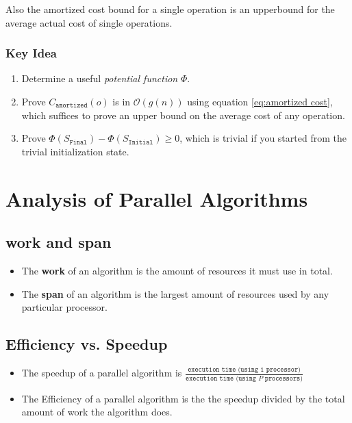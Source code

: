 \documentclass[12pt, letterpaper]{book}
\newcommand{\bigO}{\mathcal{O}}
\begin{document}
Also the amortized cost bound for a single operation is an upperbound for the average actual cost of single operations.

\subsubsection{Key Idea}

\begin{enumerate}
  \item Determine a useful \textit{potential function} $\Phi$.
  \item Prove $C_{\texttt{amortized}}(o)$ is in $\bigO(g(n))$ using equation \ref{eq:amortized cost}, which suffices to prove an upper bound on the average cost of any operation.
  \item Prove $\Phi(S_{\texttt{Final}}) - \Phi(S_{\texttt{Initial}}) \ge 0$, which is trivial if you started from the trivial initialization state.
\end{enumerate}

\section{Analysis of Parallel Algorithms} \label{parallel analysis}

\subsection{work and span}

\begin{itemize}
  \item The \textbf{work} of an algorithm is the amount of resources it must use in total.
  \item The \textbf{span} of an algorithm is the largest amount of resources used by any particular processor.
\end{itemize}

\subsection{Efficiency vs. Speedup}

\begin{itemize}
  \item The speedup of a parallel algorithm is $\frac{\texttt{execution time (using 1 processor)}}{\texttt{execution time (using $P$ processors)}}$
  \item The Efficiency of a parallel algorithm is the the speedup divided by the total amount of work the algorithm does.
\end{itemize}
\end{document}
